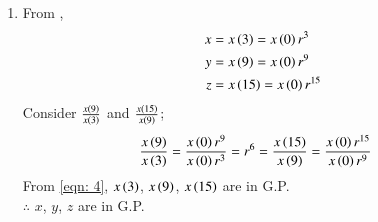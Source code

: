 \documentclass[journal,12pt,twocolumn]{IEEEtran}
\theoremstyle{remark}
\begin{document}
\begin{enumerate}
\item From ,
\begin{align}
    x&= x\left(3\right) =x\left(0\right)r^3 \\
	y&=x\left(9\right)=x\left(0\right)r^{9} \\
	z&=x\left(15\right)=x\left(0\right)r^{15}
\end{align}
Consider $\frac{x\left(9\right)}{x\left(3\right)}$ and $\frac{x\left(15\right)}{x\left(9\right)}$;
\begin{align}
	\frac{x\left(9\right)}{x\left(3\right)} &= \frac{x\left(0\right)r^{9}}{x\left(0\right)r^3} = r^6 = \frac{x\left(15\right)}{x\left(9\right)} = \frac{x\left(0\right)r^{15}}{x\left(0\right)r^{9}}\label{eqn: 4}
\end{align}
From \eqref{eqn: 4}, $x\left(3\right)$, $x\left(9\right)$, $x\left(15\right)$ are in G.P.\\
$\therefore$  $x$, $y$, $z$ are in G.P.\\


\end{enumerate}
\end{document}
